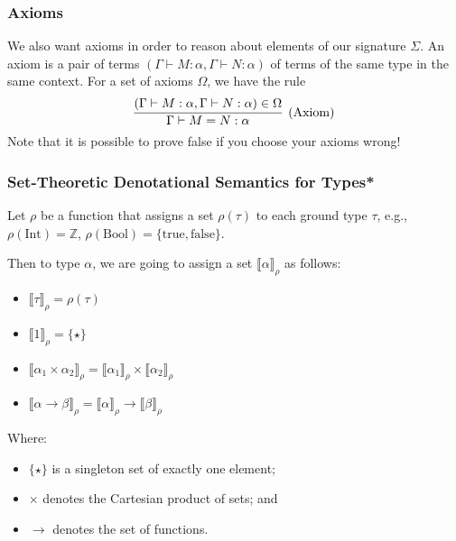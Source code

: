 \documentclass[aspectratio=169]{beamer}
\begin{document}
\begin{frame}
\frametitle{Axioms}
We also want axioms in order to reason about elements of our signature $\Sigma$.
An axiom is a pair of terms $\left(\Gamma \vdash M : \alpha, \Gamma \vdash N : \alpha\right)$ of terms of the same type in the same context.
For a set of axioms $\Omega$, we have the rule
\[
\infer[\text{(Axiom)}]{\Gamma \vdash M = N : \alpha}{\left(\Gamma \vdash M : \alpha, \Gamma \vdash N : \alpha\right) \in \Omega}
\]
Note that it is possible to prove false if you choose your axioms wrong!
\end{frame}

\begin{frame}
\frametitle{Set-Theoretic Denotational Semantics for Types*}

Let $\rho$ be a function that assigns a set $\rho(\tau)$ to each ground type $\tau$, e.g., $\rho(\text{Int}) = \mathbb{Z}$, $\rho(\text{Bool}) = \{ \text{true}, \text{false} \}$.

\pause
\medskip

Then to type $\alpha$, we are going to assign a set $\llbracket \alpha \rrbracket_{\rho}$ as follows:

\begin{itemize}
    \item $\llbracket \tau \rrbracket_{\rho} = \rho(\tau)$
    \item $\llbracket 1 \rrbracket_{\rho} = \{\star\}$
    \item $\llbracket \alpha_1 \times \alpha_2 \rrbracket_{\rho} = \llbracket \alpha_1 \rrbracket_{\rho} \times \llbracket \alpha_2 \rrbracket_{\rho}$
    \item $\llbracket \alpha \rightarrow \beta \rrbracket_{\rho} = \llbracket \alpha \rrbracket_{\rho} \rightarrow \llbracket \beta \rrbracket_{\rho}$
\end{itemize}

Where:
\begin{itemize}
    \item $\{\star\}$ is a singleton set of exactly one element;
    \item $\times$ denotes the Cartesian product of sets; and
    \item $\rightarrow$ denotes the set of functions.
\end{itemize}
\end{frame}
\end{document}
